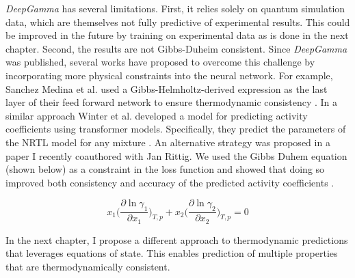 \textit{DeepGamma} has several limitations. First,  it relies solely on quantum simulation data, which are themselves not fully predictive of experimental results. This could be improved in the future by training on experimental data as is done in the next chapter. Second, the results are not Gibbs-Duheim  consistent. Since \textit{DeepGamma} was published, several works have proposed to overcome this challenge by incorporating more physical constraints into the neural network. For example, Sanchez Medina et al. used  a Gibbs-Helmholtz-derived expression as the last layer of their feed forward network to ensure thermodynamic consistency \cite{SanchezMedina2023b}. In a similar approach Winter et al. developed a model for predicting activity coefficients using transformer models. Specifically, they predict the parameters of the NRTL model for any mixture \cite{Winter2022}. An alternative strategy was proposed in a paper I recently coauthored with Jan Rittig. We used the Gibbs Duhem equation (shown below) as a constraint in the loss function and showed that doing so improved both consistency and accuracy of the predicted activity coefficients \cite{Rittig2023b}.

\begin{equation}
    x_1 \biggl (\frac{\partial \ln \gamma_1}{\partial x_1}\biggr)_{T,p} + x_2 \biggl (\frac{\partial \ln \gamma_2}{\partial x_2}\biggr)_{T,p} = 0
\end{equation}

In the next chapter, I propose a different approach to thermodynamic predictions that leverages equations of state. This enables prediction of multiple properties that are thermodynamically consistent.

